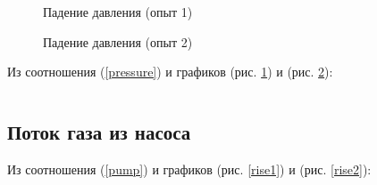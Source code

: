 \documentclass[a4paper,12pt]{article} %
\begin{document}
\begin{figure}[h]
    \caption{Падение давления (опыт 1)}
	\label{drop1}
\end{figure}

\begin{figure}[h]
    \caption{Падение давления (опыт 2)}
	\label{drop2}
\end{figure}

Из соотношения (\ref{pressure}) и графиков (рис. \ref{drop1}) и (рис. \ref{drop2}):

\begin{equation}
	
\end{equation}
\begin{equation}
	
\end{equation}

\FloatBarrier

\subsection*{Поток газа из насоса}

Из соотношения (\ref{pump}) и графиков (рис. \ref{rise1}) и (рис. \ref{rise2}):
\begin{equation}
	
\end{equation}
\begin{equation}
	
\end{equation}
\end{document}
